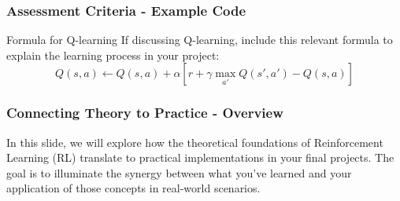 \documentclass[aspectratio=169]{beamer}
\begin{document}
\begin{frame}[fragile]
    \frametitle{Assessment Criteria - Example Code}
    \begin{block}{Formula for Q-learning}
        If discussing Q-learning, include this relevant formula to explain the learning process in your project:
        \begin{equation}
            Q(s, a) \leftarrow Q(s, a) + \alpha \left[ r + \gamma \max_{a'} Q(s', a') - Q(s, a) \right]
        \end{equation}
    \end{block}
\end{frame}

\begin{frame}[fragile]
    \frametitle{Connecting Theory to Practice - Overview}
    In this slide, we will explore how the theoretical foundations of Reinforcement Learning (RL) translate to practical implementations in your final projects. The goal is to illuminate the synergy between what you’ve learned and your application of those concepts in real-world scenarios.
\end{frame}
\end{document}
